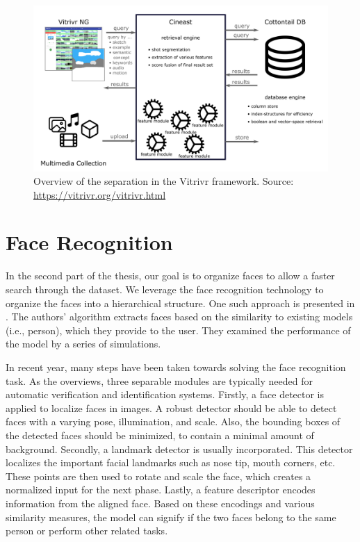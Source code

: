 \begin{figure}
    \centering
    \includegraphics[width=\linewidth]{img/vitrivr.png}
    \caption{Overview of the separation in the Vitrivr framework. Source: \url{https://vitrivr.org/vitrivr.html}}
    \label{fig:vitrivr}
\end{figure}

\section{Face Recognition}

In the second part of the thesis, our goal is to organize faces to allow a faster search through the dataset. We leverage the face recognition technology to organize the faces into a hierarchical structure. One such approach is presented in \citep{girgensohn2004leveraging}. The authors' algorithm extracts faces based on the similarity to existing models (i.e., person), which they provide to the user. They examined the performance of the model by a series of simulations. 

In recent year, many steps have been taken towards solving the face recognition task. As the \cite{ranjan2018deep} overviews, three separable modules are typically needed for automatic verification and identification systems. Firstly, a face detector is applied to localize faces in images. A robust detector should be able to detect faces with a varying pose, illumination, and scale. Also, the bounding boxes of the detected faces should be minimized, to contain a minimal amount of background. Secondly, a landmark detector is usually incorporated. This detector localizes the important facial landmarks such as nose tip, mouth corners, etc. These points are then used to rotate and scale the face, which creates a normalized input for the next phase. Lastly, a feature descriptor encodes information from the aligned face. Based on these encodings and various similarity measures, the model can signify if the two faces belong to the same person or perform other related tasks.

